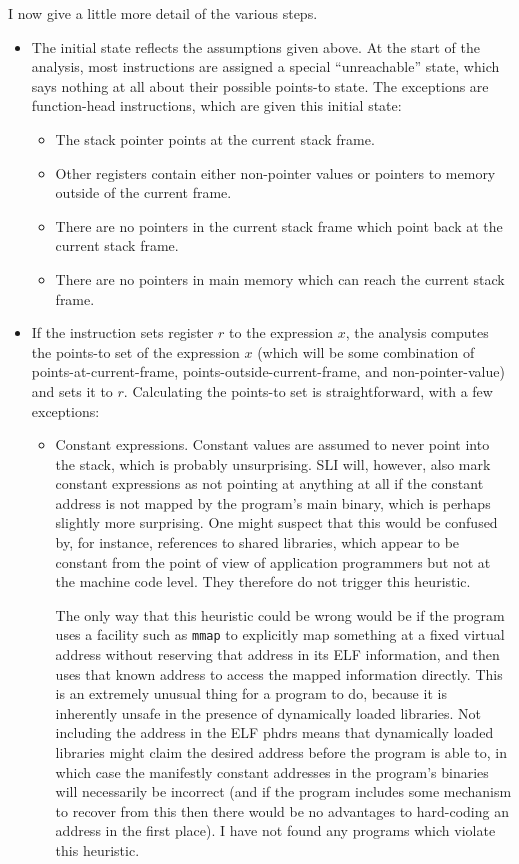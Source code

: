 I now give a little more detail of the various steps.

\begin{itemize}
\item
  The initial state reflects the assumptions given above.  At the
  start of the analysis, most instructions are assigned a special
  ``unreachable'' state, which says nothing at all about their
  possible points-to state.  The exceptions are function-head
  instructions, which are given this initial state:

  \begin{itemize}
  \item The stack pointer points at the current stack frame.
  \item Other registers contain either non-pointer values or pointers
    to memory outside of the current frame.
  \item There are no pointers in the current stack frame which point
    back at the current stack frame.
  \item There are no pointers in main memory which can reach the
    current stack frame.
  \end{itemize}
\item
  If the instruction sets register $r$ to the expression $x$, the
  analysis computes the points-to set of the expression $x$ (which
  will be some combination of points-at-current-frame,
  points-outside-current-frame, and non-pointer-value) and sets it to
  $r$.  Calculating the points-to set is straightforward, with a few
  exceptions:

  \begin{itemize}
  \item
    Constant expressions.  Constant values are assumed to never point
    into the stack, which is probably unsurprising.  SLI will,
    however, also mark constant expressions as not pointing at
    anything at all if the constant address is not mapped by the
    program's main binary, which is perhaps slightly more surprising.
    One might suspect that this would be confused by, for instance,
    references to shared libraries, which appear to be constant from
    the point of view of application programmers but not at the
    machine code level.  They therefore do not trigger this heuristic.

    The only way that this heuristic could be wrong would be if the
    program uses a facility such as \verb|mmap| to explicitly map
    something at a fixed virtual address without reserving that
    address in its ELF information, and then uses that known address
    to access the mapped information directly.  This is an extremely
    unusual thing for a program to do, because it is inherently unsafe
    in the presence of dynamically loaded libraries.  Not including
    the address in the ELF phdrs means that dynamically loaded
    libraries might claim the desired address before the program is
    able to, in which case the manifestly constant addresses in the
    program's binaries will necessarily be incorrect (and if the
    program includes some mechanism to recover from this then there
    would be no advantages to hard-coding an address in the first
    place).  I have not found any programs which violate this
    heuristic.


\end{itemize}
\end{itemize}

